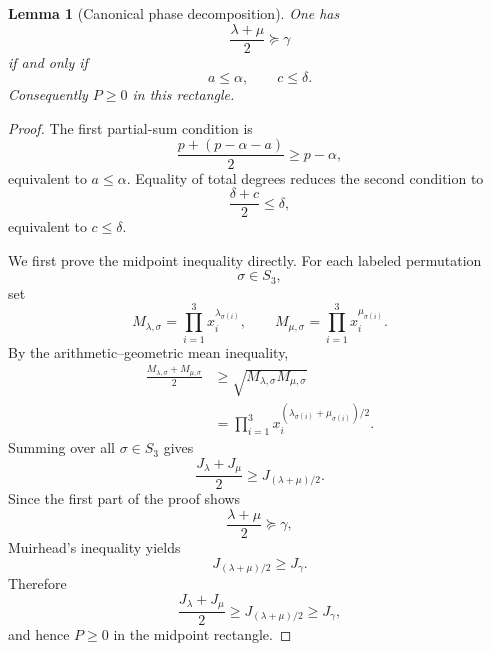 \documentclass[11pt]{article}
\newtheorem{lemma}[theorem]{Lemma}
\theoremstyle{definition}
\begin{document}
\begin{lemma}[Canonical phase decomposition]
\label{lem:phase-decomposition}
One has
\begin{equation*}
\frac{\lambda+\mu}{2}\succcurlyeq\gamma
\end{equation*}
if and only if
\begin{equation*}
a\le\alpha,
\qquad
c\le\delta.
\end{equation*}
Consequently \(P\ge0\) in this rectangle.
\end{lemma}

\begin{proof}
The first partial-sum condition is
\begin{equation*}
\frac{p+(p-\alpha-a)}2\ge p-\alpha,
\end{equation*}
equivalent to \(a\le\alpha\). Equality of total degrees reduces the second condition to
\begin{equation*}
\frac{\delta+c}{2}\le\delta,
\end{equation*}
equivalent to \(c\le\delta\).

We first prove the midpoint inequality directly.  For each labeled permutation
\begin{equation*}
\sigma\in S_3,
\end{equation*}
set
\begin{equation*}
M_{\lambda,\sigma}
=
\prod_{i=1}^{3}x_i^{\lambda_{\sigma(i)}},
\qquad
M_{\mu,\sigma}
=
\prod_{i=1}^{3}x_i^{\mu_{\sigma(i)}}.
\end{equation*}
By the arithmetic--geometric mean inequality,
\begin{align*}
\frac{M_{\lambda,\sigma}+M_{\mu,\sigma}}{2}
&\ge
\sqrt{M_{\lambda,\sigma}M_{\mu,\sigma}}\\
&=
\prod_{i=1}^{3}
 x_i^{(\lambda_{\sigma(i)}+\mu_{\sigma(i)})/2}.
\end{align*}
Summing over all \(\sigma\in S_3\) gives
\begin{equation*}
\frac{J_\lambda+J_\mu}{2}
\ge
J_{(\lambda+\mu)/2}.
\end{equation*}
Since the first part of the proof shows
\begin{equation*}
\frac{\lambda+\mu}{2}\succcurlyeq\gamma,
\end{equation*}
Muirhead's inequality yields
\begin{equation*}
J_{(\lambda+\mu)/2}
\ge
J_\gamma.
\end{equation*}
Therefore
\begin{equation*}
\frac{J_\lambda+J_\mu}{2}
\ge
J_{(\lambda+\mu)/2}
\ge
J_\gamma,
\end{equation*}
and hence \(P\ge0\) in the midpoint rectangle.
\end{proof}
\end{document}
